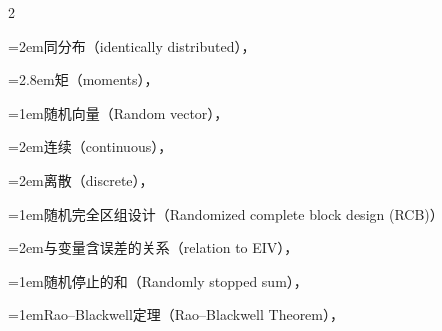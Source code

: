 \begin{multicols}{2}
\par\noindent\hangindent=2em\hspace*{1em}\label{idx:869}同分布（identically distributed），\hyperref[def:1.5.8]{\pageref*{def:1.5.8}}\par
\par\noindent\hangindent=2.8em\hspace*{1.8em}\label{idx:870}矩（moments），\hyperref[thm:2.3.11]{\pageref*{thm:2.3.11}}\par
\par\addvspace{2pt}
\par\noindent\hangindent=1em\hspace*{0em}\label{idx:871}随机向量（Random vector），\hyperref[def:4.1.1]{\pageref*{def:4.1.1}}\par
\par\noindent\hangindent=2em\hspace*{1em}\label{idx:872}连续（continuous），\hyperref[def:4.1.10]{\pageref*{def:4.1.10}}\par
\par\noindent\hangindent=2em\hspace*{1em}\label{idx:873}离散（discrete），\hyperref[idxocc:873:146]{\pageref*{idxocc:873:146}}\par
\par\addvspace{2pt}
\par\noindent\hangindent=1em\hspace*{0em}\label{idx:874}随机完全区组设计（Randomized complete block design (RCB)）\par
\par\noindent\hangindent=2em\hspace*{1em}\label{idx:875}与变量含误差的关系（relation to EIV），\hyperref[idxocc:875:506]{\pageref*{idxocc:875:506}}\par
\par\addvspace{2pt}
\par\noindent\hangindent=1em\hspace*{0em}\label{idx:876}随机停止的和（Randomly stopped sum），\hyperref[exercise:4.33]{\pageref*{exercise:4.33}}\par
\par\addvspace{2pt}
\par\noindent\hangindent=1em\hspace*{0em}\label{idx:877}Rao–Blackwell定理（Rao–Blackwell Theorem），\hyperref[thm:7.3.17]{\pageref*{thm:7.3.17}}\par

\end{multicols}
